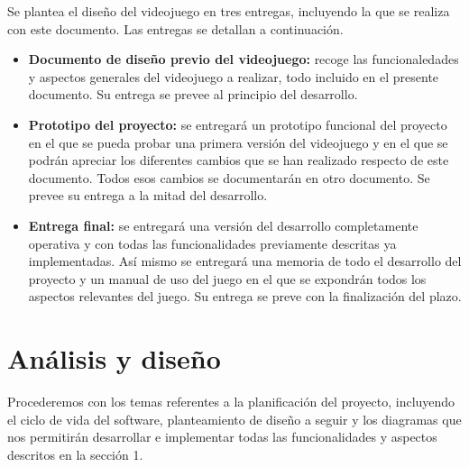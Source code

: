 \documentclass[palatino]{apuntes}
\begin{document}
Se plantea el diseño del videojuego en tres entregas, incluyendo la que se realiza con este documento. Las entregas se detallan a continuación.


\begin{itemize}
	\item \textbf{Documento de diseño previo del videojuego:} recoge las funcionaledades y aspectos generales del videojuego a realizar, todo incluido en el presente documento. Su entrega se prevee al principio del desarrollo.
	\item \textbf{Prototipo del proyecto:} se entregará un prototipo funcional del proyecto en el que se pueda probar una primera versión del videojuego y en el que se podrán apreciar los diferentes cambios que se han realizado respecto de este documento. Todos esos cambios se documentarán en otro documento. Se prevee su entrega a la mitad del desarrollo.
	\item \textbf{Entrega final:} se entregará una versión del desarrollo completamente operativa y con todas las funcionalidades previamente descritas ya implementadas. Así mismo se entregará una memoria de todo el desarrollo del proyecto y un manual de uso del juego en el que se expondrán todos los aspectos relevantes del juego. Su entrega se preve con la finalización del plazo.
\end{itemize}































\chapter{Análisis y diseño}
Procederemos con los temas referentes a la planificación del proyecto, incluyendo el ciclo de vida del software, planteamiento de diseño a seguir y los diagramas que nos permitirán desarrollar e implementar todas las funcionalidades y aspectos descritos en la sección 1.
\end{document}
